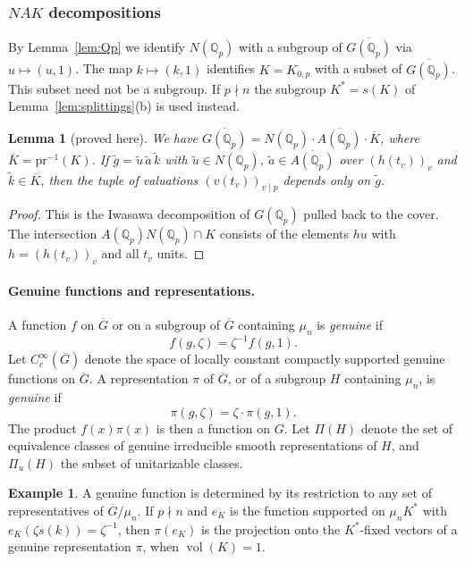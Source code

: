 \documentclass[12pt,letterpaper]{article}
\numberwithin{equation}{section}
\newtheorem{lemma}[theorem]{Lemma}
\theoremstyle{definition}
\newtheorem{xexample}[theorem]{Example}
\newcommand{\proved}{proved here}
\newcommand{\Q}{\mathbb Q}
\newcommand{\bG}{\overline{G}}
\newcommand{\bK}{\overline{K}}
\newcommand{\pr}{\mathrm{pr}}
\DeclareMathOperator{\vol}{vol}
\begin{document}
\subsubsection{\texorpdfstring{$NAK$ decompositions}{NAK decompositions}}

By Lemma~\ref{lem:Qp} we identify $N(\Q_p)$ with a subgroup of $\overline{G(\Q_p)}$ via
$u\mapsto(u,1)$.  The map $k\mapsto(k,1)$ identifies $K=K_{0,p}$ with a subset of
$\overline{G(\Q_p)}$.  This subset need not be a subgroup.  If $p\nmid n$ the subgroup
$K^*=s(K)$ of Lemma~\ref{lem:splittings}(b) is used instead.

\begin{lemma}[\proved]\label{lem:NAK}
We have $\overline{G(\Q_p)}=N(\Q_p)\cdot\overline{A(\Q_p)}\cdot\bK$, where $\bK=\pr^{-1}(K)$.
If $\tilde g=\tilde u\,\tilde a\,\tilde k$ with $\tilde u\in N(\Q_p)$,
$\tilde a\in\overline{A(\Q_p)}$ over $(h(t_v))_v$ and $\tilde k\in\bK$, then the tuple of
valuations $(v(t_v))_{v\mid p}$ depends only on $\tilde g$.
\end{lemma}
\begin{proof}
This is the Iwasawa decomposition of $G(\Q_p)$ pulled back to the cover.  The intersection
$A(\Q_p)N(\Q_p)\cap K$ consists of the elements $hu$ with $h=(h(t_v))_v$ and all $t_v$
units.
\end{proof}

\paragraph{Genuine functions and representations.}  A function $f$ on $\bG$ or on a
subgroup of $\bG$ containing $\mu_n$ is \emph{genuine} if
\begin{equation}\label{eq:genuine-f}
f(g,\zeta)=\zeta^{-1}f(g,1).
\end{equation}
Let $C_c^\infty(\bG)$ denote the space of locally constant compactly supported genuine
functions on $\bG$.  A representation $\pi$ of $\bG$, or of a subgroup $H$ containing
$\mu_n$, is \emph{genuine} if
\begin{equation}\label{eq:genuine-pi}
\pi(g,\zeta)=\zeta\cdot\pi(g,1).
\end{equation}
The product $f(x)\pi(x)$ is then a function on $G$.  Let $\Pi(H)$ denote the set of
equivalence classes of genuine irreducible smooth representations of $H$, and $\Pi_u(H)$ the
subset of unitarizable classes.

\begin{xexample}
A genuine function is determined by its restriction to any set of representatives of
$\bG/\mu_n$.  If $p\nmid n$ and $e_K$ is the function supported on $\mu_nK^*$ with
$e_K(\zeta s(k))=\zeta^{-1}$, then $\pi(e_K)$ is the projection onto the $K^*$-fixed
vectors of a genuine representation $\pi$, when $\vol(K)=1$.
\end{xexample}
\end{document}
